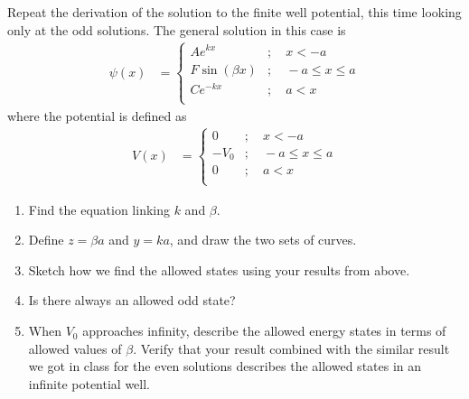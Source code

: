 \documentclass[fleqn, a4paper, 11pt, oneside]{amsart}
\theoremstyle{definition}
\theoremstyle{theorem}
\begin{document}
\begin{question}
	Repeat the derivation of the solution to the finite well potential, this time looking only at the odd solutions.
	The general solution in this case is
	\begin{align*}
		\psi(x) &=
			\begin{cases}
				A e^{k x}       & ;\quad x < -a         \\
				F \sin(\beta x) & ;\quad -a \le x \le a \\
				C e^{-k x}      & ;\quad a < x          \\
			\end{cases}
	\end{align*}
	where the potential is defined as
	\begin{align*}
		V(x) &=
			\begin{cases}
				0    & ;\quad x < -a         \\
				-V_0 & ;\quad -a \le x \le a \\
				0    & ;\quad a < x          \\
			\end{cases}
	\end{align*}
	\begin{enumerate}
		\item
			Find the equation linking $k$ and $\beta$.
		\item
			Define $z = \beta a$ and $y = k a$, and draw the two sets of curves.
		\item
			Sketch how we find the allowed states using your results from above.
		\item
			Is there always an allowed odd state?
		\item
			When $V_0$ approaches infinity, describe the allowed energy states in terms of allowed values of $\beta$.
			Verify that your result combined with the similar result we got in class for the even solutions describes the allowed states in an infinite potential well.
	\end{enumerate}
\end{question}
\end{document}

